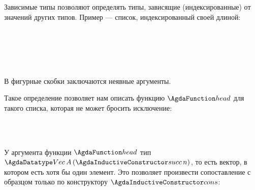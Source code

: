 Зависимые типы позволяют определять типы, зависящие (индексированные) от значений
других типов. Пример — список, индексированный своей длиной:
\begin{code}\>\<%
\\
\>  \AgdaSymbol{(} \AgdaSymbol{:} \AgdaSymbol{)} \AgdaSymbol{:}    \<%
\\
\>[0]\<[2]%
\>[2] \<[7]%
\>[7]\AgdaSymbol{:}   \<%
\\
\>[0]\<[2]%
\>[2] \AgdaSymbol{:}  \AgdaSymbol{\{}\AgdaSymbol{\}}          \AgdaSymbol{(} \AgdaSymbol{)}\<%
\\
\>\<\end{code}
В фигурные скобки заключаются неявные аргументы.

Такое определение позволяет нам описать функцию $ \F{head} $ для такого списка, которая не может бросить исключение:
\begin{code}\>\<%
\\
\> \AgdaSymbol{:}  \AgdaSymbol{\{}\AgdaSymbol{\}} \AgdaSymbol{\{}\AgdaSymbol{\}}    \AgdaSymbol{(} \AgdaSymbol{)}  \<%
\\
\>\<\end{code}
У аргумента функции $ \F{head} $ тип $ \D{Vec}\,A\,(\DC{succ}\,n) $, то есть вектор, в котором есть хотя бы один элемент.
Это позволяет произвести сопоставление с образцом только по конструктору $ \DC{cons} $:
\begin{code}\>\<%
\\
\> \AgdaSymbol{(}  \AgdaSymbol{)} \AgdaSymbol{=} \<%
\\
\>\<\end{code}


